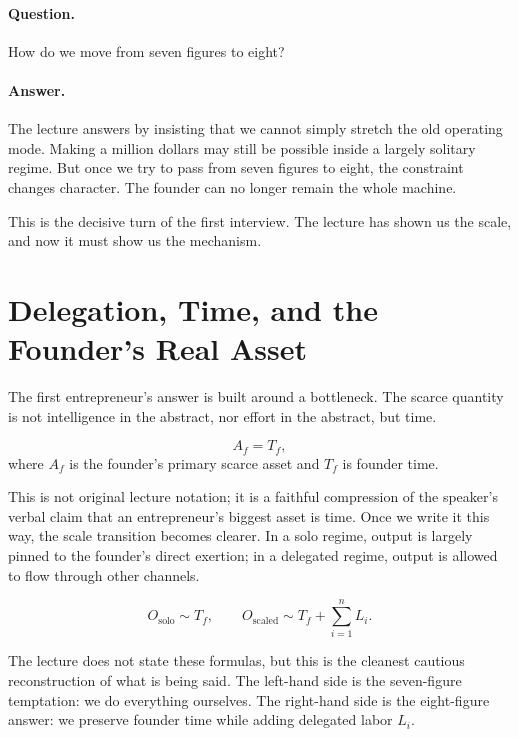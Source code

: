 \paragraph{Question.}
How do we move from seven figures to eight?

\paragraph{Answer.}
The lecture answers by insisting that we cannot simply stretch the old operating mode. Making a million dollars may still be possible inside a largely solitary regime. But once we try to pass from seven figures to eight, the constraint changes character. The founder can no longer remain the whole machine.

This is the decisive turn of the first interview. The lecture has shown us the scale, and now it must show us the mechanism.

\section{Delegation, Time, and the Founder's Real Asset}

The first entrepreneur's answer is built around a bottleneck. The scarce quantity is not intelligence in the abstract, nor effort in the abstract, but time.

\begin{equation}
A_f = T_f,
\end{equation}
where \(A_f\) is the founder's primary scarce asset and \(T_f\) is founder time.

This is not original lecture notation; it is a faithful compression of the speaker's verbal claim that an entrepreneur's biggest asset is time. Once we write it this way, the scale transition becomes clearer. In a solo regime, output is largely pinned to the founder's direct exertion; in a delegated regime, output is allowed to flow through other channels.

\begin{equation}
O_{\text{solo}} \sim T_f,
\qquad
O_{\text{scaled}} \sim T_f + \sum_{i=1}^{n} L_i.
\end{equation}

The lecture does not state these formulas, but this is the cleanest cautious reconstruction of what is being said. The left-hand side is the seven-figure temptation: we do everything ourselves. The right-hand side is the eight-figure answer: we preserve founder time while adding delegated labor \(L_i\).

